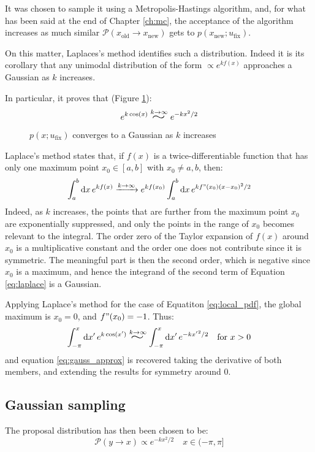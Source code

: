 It was chosen to sample it using a Metropolis-Hastings algorithm,
and, for what has been said at the end of Chapter \ref{ch:mc},
the acceptance of the algorithm increases as much similar $\mathcal P(x_\mathrm{old}\to x_\mathrm{new})$ gets to $p(x_\mathrm{new};u_\mathrm{fix})$.

On this matter, Laplaces's method identifies such a distribution.
Indeed it is its corollary that any unimodal distribution of the form $\propto e^{kf(x)}$ approaches a Gaussian as $k$ increases.

In particular, it proves that (Figure \ref{fig:gauss}):
\begin{equation}\label{eq:gauss_approx}
    e^{k\cos(x)} \stackrel{k\to\infty}{\scalebox{2}[1.25]{$\sim$}} e^{-kx^2/2}
\end{equation}

\begin{figure}[!htb]
    \centering
    
    \caption{$p(x;u_\mathrm{fix})$ converges to a Gaussian as $k$ increases}
    \label{fig:gauss}
\end{figure}

Laplace's method states that, if $f(x)$ is a twice-differentiable function that has only one maximum point $x_0 \in [a,b]$ with $x_0 \neq a,b$,
then:
\begin{equation}\label{eq:laplace}
	\int_a^b\mathrm dx\,e^{kf(x)} \xrightarrow{k\to\infty} e^{kf(x_0)}\int_a^b\mathrm dx\,e^{kf"(x_0)(x-x_0)^2/2}
\end{equation}
Indeed, as $k$ increases, the points that are further from the maximum point $x_0$ are exponentially suppressed,
and only the points in the range of $x_0$ becomes relevant to the integral.
The order zero of the Taylor expansion of $f(x)$ around $x_0$ is a multiplicative constant and the order one does not contribute since it is symmetric.
The meaningful part is then the second order, which is negative since $x_0$ is a maximum,
and hence the integrand of the second term of Equation \eqref{eq:laplace} is a Gaussian.

Applying Laplace's method for the case of Equatiton \eqref{eq:local_pdf},
the global maximum is $x_0=0$, and $f"(x_0) = -1$.
Thus:
\[
    \int_{-\pi}^x\mathrm dx'\,e^{k\cos(x')} \stackrel{k\to\infty}{\scalebox{2}[1.25]{$\sim$}} \int_{-\pi}^x\mathrm dx'\,e^{-k{x'}^2/2} \quad \mathrm{for}\ x>0
\]
and equation \eqref{eq:gauss_approx} is recovered taking the derivative of both members, and extending the results for symmetry around $0$.

\subsection*{Gaussian sampling}
The proposal distribution has then been chosen to be:
\begin{equation}\label{eq:gauss_proposal}
    \mathcal P(y\to x) \propto e^{-kx^2/2} \quad x \in (-\pi,\pi]
\end{equation}

